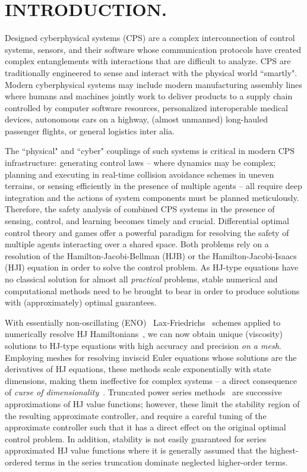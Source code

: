 \section{INTRODUCTION.}
%
\noindent Designed cyberphysical systems (CPS) are  a complex interconnection of control systems, sensors, and their software whose communication protocols have created complex entanglements with interactions that are difficult to analyze.  CPS are traditionally engineered to sense and interact with the physical world ``smartly". Modern cyberphysical systems may include modern manufacturing assembly lines where humans and machines jointly work to deliver products to a supply chain controlled by computer software resources, personalized interoperable medical devices, autonomous cars on a highway, (almost unmanned) long-hauled passenger flights, or general logistics inter alia. 

The ``physical" and ``cyber" couplings of such systems is critical in modern CPS infrastructure: generating control laws -- where dynamics may be complex; planning and executing in real-time collision avoidance schemes in uneven terrains, or sensing efficiently in the presence of multiple agents -- all require deep integration and the actions of system components must be planned meticulously. Therefore,  the safety analysis of combined CPS systems in the presence of sensing, control, and learning becomes timely and crucial. Differential optimal control theory and games offer a powerful paradigm for resolving the safety of multiple agents interacting over a shared space. Both problems rely on a resolution of the Hamilton-Jacobi-Bellman (HJB) or the Hamilton-Jacobi-Isaacs (HJI) equation in order to solve the control problem.  As HJ-type equations have no classical solution for almost all \textit{practical} problems, stable numerical and computational methods need to be brought to bear in order to produce solutions with (approximately) optimal guarantees. 

With essentially non-oscillating (ENO)~\cite{OsherShuENO} Lax-Friedrichs~\cite{CrandallLaxFriedrichs} schemes applied to numerically resolve HJ Hamiltonians~\cite{Evans1984}, we can now obtain  unique (viscosity) solutions to HJ-type equations with high accuracy and precision \textit{on a mesh}. Employing meshes for resolving inviscid Euler equations whose solutions are the derivatives of HJ equations, these methods scale exponentially with state dimensions, making them ineffective for complex systems  -- a direct consequence of \textit{curse of dimensionality}~\cite{Bellman1957}. Truncated power series methods~\cite{Jacobson1968new, JacobsonMayne, 	DenhamDDP, TodorovCDC} are successive approximations of HJ value functions; however, these limit the stability region of the resulting approximate controller, and require a careful tuning of the approximate controller such that it has a direct effect on the original optimal control problem.  In addition, stability is not easily guaranteed for series approximated HJ value functions where it is generally assumed that the highest-ordered terms in the series truncation dominate neglected higher-order terms.

